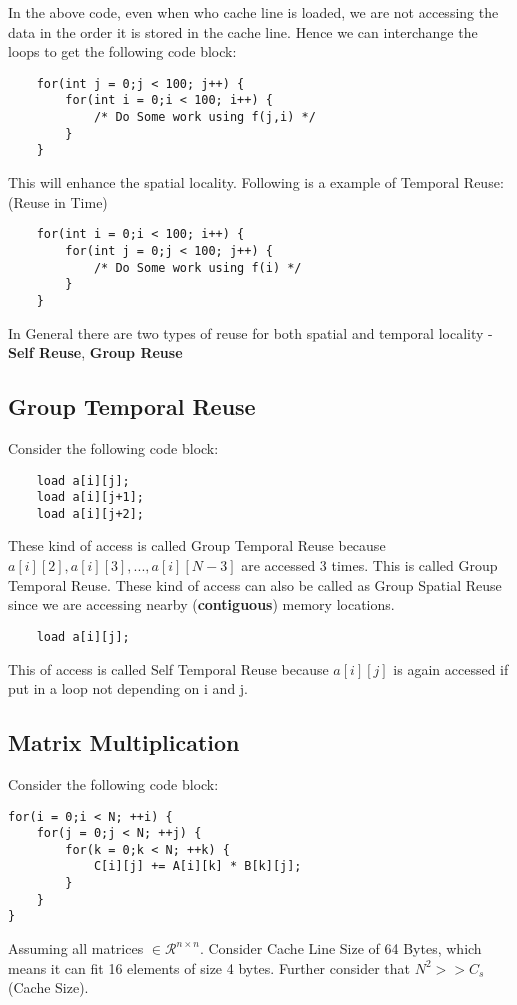 \documentclass{article}
\begin{document}
In the above code, even when who cache line is loaded, we are not accessing the data in the order it is stored in the cache line. Hence we can interchange the loops to get the following code block:
\begin{lstlisting}
    for(int j = 0;j < 100; j++) {
        for(int i = 0;i < 100; i++) {
            /* Do Some work using f(j,i) */
        }
    }
\end{lstlisting}

This will enhance the spatial locality. Following is a example of Temporal Reuse: (Reuse in Time)
\begin{lstlisting}
    for(int i = 0;i < 100; i++) {
        for(int j = 0;j < 100; j++) {
            /* Do Some work using f(i) */
        }
    }
\end{lstlisting}

In General there are two types of reuse for both spatial and temporal locality - \textbf{Self Reuse}, \textbf{Group Reuse}

\subsection*{Group Temporal Reuse}
Consider the following code block:
\begin{lstlisting}
    load a[i][j];
    load a[i][j+1];
    load a[i][j+2];
\end{lstlisting}

These kind of access is called Group Temporal Reuse because $a[i][2], a[i][3], ..., a[i][N-3]$ are accessed 3 times. This is called Group Temporal Reuse. These kind of access can also be called as Group Spatial Reuse since we are accessing nearby (\textbf{contiguous}) memory locations.

\begin{lstlisting}
    load a[i][j];
\end{lstlisting}
This of access is called Self Temporal Reuse because $a[i][j]$ is again accessed if put in a loop not depending on i and j.

\subsection*{Matrix Multiplication}
Consider the following code block:
\begin{lstlisting}
for(i = 0;i < N; ++i) {
    for(j = 0;j < N; ++j) {
        for(k = 0;k < N; ++k) {
            C[i][j] += A[i][k] * B[k][j];
        }
    }
}
\end{lstlisting}
Assuming all matrices $\in \mathcal{R}^{n \times n}$. Consider Cache Line Size of 64 Bytes, which means it can fit 16 elements of size 4 bytes. Further consider that $N^2 >> C_s$ (Cache Size).
\end{document}
